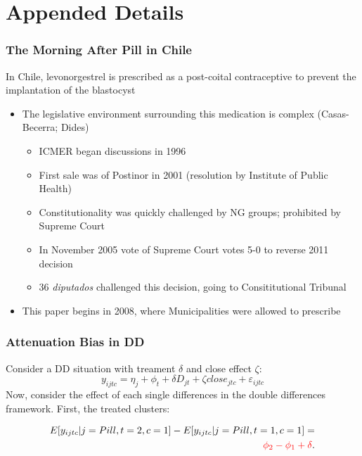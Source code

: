 \documentclass[10pt,letterpaper,subeqn]{beamer}
\begin{document}
\section{Appended Details}

\begin{frame}[label=PAE]
\frametitle{The Morning After Pill in Chile}
In Chile, levonorgestrel is prescribed as a post-coital contraceptive to prevent the implantation
of the blastocyst\\
\vspace{5mm}
\begin{itemize}
\item The legislative environment surrounding this medication is complex (Casas-Becerra; Dides)
\begin{itemize}
\item ICMER began discussions in 1996
\item First sale was of Postinor in 2001 (resolution by Institute of Public Health)
\item Constitutionality was quickly challenged by NG groups; prohibited by Supreme Court
\item In November 2005 vote of Supreme Court votes 5-0 to reverse 2011 decision
\item 36 \emph{diputados} challenged this decision, going to Consititutional Tribunal
\end{itemize}
\item This paper begins in 2008, where Municipalities were allowed to prescribe
\end{itemize}
\hyperlink{Context}{}
\end{frame}

\begin{frame}[label=sumR]

\hyperlink{sum}{}
\end{frame}

\begin{frame}[label=demonstrate]
\frametitle{Attenuation Bias in DD}
Consider a DD situation with treament $\delta$ and close effect $\zeta$:
\begin{equation}
 \label{TEENeqn:DDa1}
 y_{ijtc} = \eta_j + \phi_t + \delta D_{jt} + \zeta close_{jtc} + 
\varepsilon_{ijtc}
\end{equation}
\vspace{1cm}
Now, consider the effect of each single differences in the double differences
framework.  First, the treated clusters:

\begin{eqnarray}
\label{TEENeqn:diftreat}
\nonumber
 E[y_{ijtc}|j=Pill,t=2,c=1]-E[y_{ijtc}|j=Pill,t=1,c=1] = \\ \nonumber
 \textcolor{red}{\phi_2-\phi_1+\delta}.
\end{eqnarray}
\end{frame}
\end{document}
